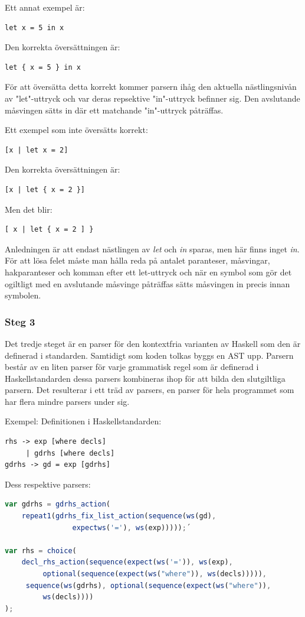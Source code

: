 Ett annat exempel är:
\begin{lstlisting}
let x = 5 in x
\end{lstlisting}
Den korrekta översättningen är:
\begin{lstlisting}
let { x = 5 } in x
\end{lstlisting}
För att översätta detta korrekt kommer parsern ihåg den aktuella nästlingsnivån av "let"-uttryck och var deras repsektive "in"-uttryck befinner sig. 
Den avslutande måsvingen sätts in där ett matchande "in"-uttryck påträffas.

Ett exempel som inte översätts korrekt:
\begin{lstlisting}
[x | let x = 2]
\end{lstlisting}
Den korrekta översättningen är:
\begin{lstlisting}
[x | let { x = 2 }]
\end{lstlisting}
Men det blir:
\begin{lstlisting}
[ x | let { x = 2 ] }
\end{lstlisting}
Anledningen är att endast nästlingen av \emph{let} och \emph{in} sparas, men här finns inget \emph{in}.
För att lösa felet måste man hålla reda på antalet paranteser, måsvingar, hakparanteser och komman efter ett let-uttryck och när en symbol som gör det ogiltligt 
med en avslutande måsvinge påträffas sätts måsvingen in precis innan symbolen.

\subsubsection{Steg 3}
Det tredje steget är en parser för den kontextfria varianten av Haskell som den är definerad i standarden. 
Samtidigt som koden tolkas byggs en AST upp. Parsern består av en liten parser för varje grammatisk regel som är definerad i Haskellstandarden 
dessa parsers kombineras ihop för att bilda den slutgiltliga parsern. Det resulterar i ett träd av parsers, en parser för hela programmet som har flera mindre parsers under sig.

Exempel:
Definitionen i Haskellstandarden:
\begin{lstlisting}
rhs -> exp [where decls]
     | gdrhs [where decls]
gdrhs -> gd = exp [gdrhs]
\end{lstlisting}
Dess respektive parsers:
\begin{lstlisting}[language=javascript]
var gdrhs = gdrhs_action(
    repeat1(gdrhs_fix_list_action(sequence(ws(gd), 
                expectws('='), ws(exp)))));´

var rhs = choice(
    decl_rhs_action(sequence(expect(ws('=')), ws(exp), 
         optional(sequence(expect(ws("where")), ws(decls))))),
     sequence(ws(gdrhs), optional(sequence(expect(ws("where")), 
         ws(decls))))
);
\end{lstlisting}

